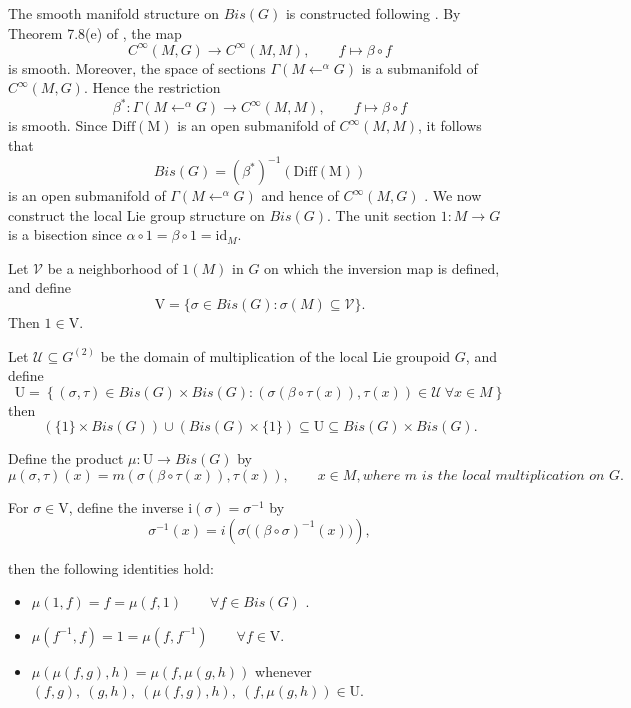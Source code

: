 \documentclass[12pt,a4paper]{amsart}
\makeatletter
\theoremstyle{plain}
\theoremstyle{definition}
\renewenvironment{proof}[1][\proofname]{%
  \par\vspace{0.1em} %
  \pushQED{\qed}%
  \normalfont \topsep0pt \trivlist
  \item[\hskip\labelsep\itshape #1\@addpunct{.}]\ignorespaces
}{%
  \popQED\endtrivlist\@endpefalse
}
\makeatother
\begin{document}
\begin{proof}


The smooth manifold structure on $Bis(G)$ is constructed following \cite{Schmeding}. 
By Theorem 7.8(e) of \cite{Schmeding}, the map
\[
C^\infty(M,G)\to C^\infty(M,M),\qquad
f\mapsto \beta\circ f
\]
is smooth. Moreover, the space of sections
$\Gamma(M \leftarrow^\alpha G)$ 
is a submanifold of $C^\infty(M,G)$. Hence the restriction
\[
\beta^*:\Gamma(M \leftarrow^\alpha G)\to C^\infty(M,M),\qquad
f\mapsto \beta\circ f
\]
is smooth.
Since $\mathrm{Diff(M)}$ is an open submanifold of 
$C^\infty(M,M)$, it follows that
\[
Bis(G)=({\beta^*})^{-1}(\mathrm{Diff(M)})
\]
is an open submanifold of 
$\Gamma(M \leftarrow^\alpha G)$ and hence of $C^{\infty}(M,G)$ .
We now construct the local Lie group structure on $Bis(G)$.
The unit section
$ 
1:M\to G
$ 
is a bisection since
$ \alpha\circ 1=\beta\circ 1=\mathrm{id}_M.
$ 

Let $\mathcal V$ be a neighborhood of $1(M)$ in $G$
on which the inversion map is defined, and define
\[
\mathrm V
=
\{
\sigma\in Bis(G):
\sigma(M)\subseteq \mathcal V
\}.
\]
Then $1\in \mathrm V$.

Let $\mathcal U\subseteq G^{(2)}$ be the domain of multiplication of the local Lie groupoid $G$, and define
\[
\mathrm U
=
\left\{
(\sigma,\tau)\in Bis(G)\times  Bis(G):
(\sigma(\beta\circ\tau(x)),\tau(x))
\in \mathcal U
\ \forall x\in M
\right\}
\]
then
\[
(\{1\}\times Bis(G))
\cup
(Bis(G)\times\{1\})
\subseteq
\mathrm U
\subseteq
Bis(G)\times Bis(G).
\]

Define the product
$\mu:\mathrm U\to Bis(G)$ 
by
\[
\mu(\sigma,\tau)(x)
=
m(\sigma(\beta\circ\tau(x)),\tau(x)),
\qquad x\in M, where\,\, m\,\, is \,\,the \,\,local\,\,multiplication\,\, on\,\, G.
\]

For $\sigma\in \mathrm V$, define the inverse  $\mathrm{i}(\sigma)=\sigma^{-1}$  by
\[
\sigma^{-1}(x)
=
i\!\left(
\sigma\bigl((\beta\circ\sigma)^{-1}(x)\bigr)
\right),
\]

then the following identities hold:
\begin{itemize}
\setlength{\itemsep}{0.5em}

    \item 
    $\mu(1,f)=f=\mu(f,1)
    \qquad \forall f\in Bis(G)$ .

    \item $\mu(f^{-1},f)
    =
    1
    =
    \mu(f,f^{-1})
    \qquad \forall f\in \mathrm V$.

    \item $\mu(\mu(f,g),h)
    =\mu(f,\mu(g,h))$   whenever \small${
     (f,g),\ (g,h),\ (\mu(f,g),h),\ (f,\mu(g,h))
    \in \mathrm U}$.
    

\end{itemize}
\end{proof}
\end{document}
